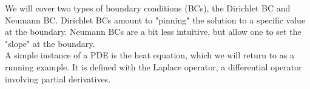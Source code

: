 We will cover two types of boundary conditions (BCs), the Dirichlet BC and Neumann BC. 
Dirichlet BCs amount to "pinning" the solution to a specific value at the boundary.
Neumann BCs are a bit less intuitive, but allow one to set the "slope" at the boundary.
\\A simple instance of a PDE is the heat equation, which we will return to as a running example. It is defined with the Laplace operator, a differential operator involving partial derivatives. 
